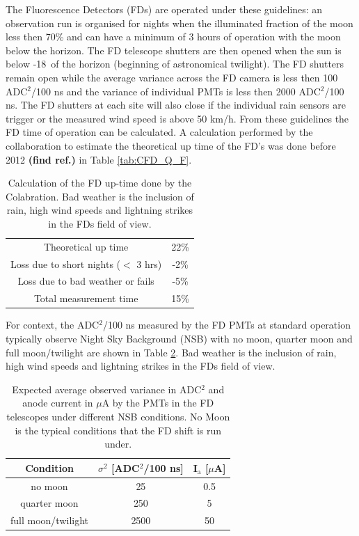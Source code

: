 The Fluorescence Detectors (FDs) are operated under these guidelines: an observation run is organised for nights when the illuminated fraction of the moon less then 70\% and can have a minimum of 3 hours of operation with the moon below the horizon. The FD telescope shutters are then opened when the sun is below -18\textdegree \ of the horizon (beginning of astronomical twilight). The FD shutters remain open while the average variance across the FD camera is less then 100 ADC$^2$/100 ns and the variance of individual PMTs is less then 2000 ADC$^2$/100 ns. The FD shutters at each site will also close if the individual rain sensors are trigger or the measured wind speed is above 50 km/h.  From these guidelines the FD time of operation can be calculated. A calculation performed by the collaboration to estimate the theoretical up time of the FD's was done before 2012 \textbf{(find ref.)} in Table \ref{tab:CFD_Q_F}.
\begin{table}[h]
\centering
\begin{tabular}{c c}
\hline\hline
Theoretical up time & 22\% \\
Loss due to short nights ($<$ 3 hrs) & -2\% \\
Loss due to bad weather or fails & -5\% \\ \hline \hline
Total measurement time & 15\% \\
\hline\hline
\end{tabular}
\caption{Calculation of the FD up-time done by the Colabration. Bad weather is the inclusion of rain, high wind speeds and lightning strikes in the FDs field of view.} \label{tab:FD_uptime}
\end{table}
For context, the ADC$^2$/100 ns measured by the FD PMTs at standard operation typically observe Night Sky Background (NSB) with no moon, quarter moon and full moon/twilight are shown in Table \ref{tab:MoonLightADC}. Bad weather is the inclusion of rain, high wind speeds and lightning strikes in the FDs field of view.
\begin{table}[h]
\centering
\begin{tabular}{c c c}
\hline\hline
Condition & $\sigma^2$ [ADC$^2$/100 ns] & I$_{\mathrm{a}}$ [$\mu$A] \\ \hline\hline
no moon & 25 & 0.5 \\
quarter moon & 250 & 5 \\
full moon/twilight & 2500 & 50 \\ 
\hline\hline
\end{tabular}
\caption{Expected average observed variance in ADC$^2$ and anode current in $\mu$A by the PMTs in the FD telescopes under different NSB conditions. No Moon is the typical conditions that the FD shift is run under.  } \label{tab:MoonLightADC}
\end{table}

